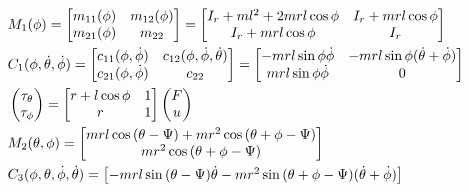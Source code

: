 \begin{align}
&M_1(\phi)
=\begin{bmatrix}
m_{11}(\phi) &m_{12}(\phi)\\
m_{21}(\phi) &m_{22}
\end{bmatrix}
=\begin{bmatrix}
I_r+ml^2+2mrl\cos{\phi}  &I_r+mrl\cos{\phi}\\
I_r+mrl\cos{\phi}       &I_r
\end{bmatrix}\label{eq:M1}\\
&C_1(\phi,\dot{\theta},\dot{\phi})=
\begin{bmatrix}
c_{11}(\phi,\dot{\phi}) &c_{12}(\phi,\dot{\phi},\dot{\theta})\\
c_{21}(\phi,\dot{\phi}) &c_{22}
\end{bmatrix}=
\begin{bmatrix}
-mrl\sin{\phi}\dot{\phi}   &-mrl\sin{\phi}(\dot{\theta}+\dot{\phi})\\
mrl\sin{\phi}\dot{\phi}    &0
\end{bmatrix}\label{eq:C1}\\
&\begin{pmatrix}
\tau_\theta\\
\tau_\phi
\end{pmatrix}
=
\begin{bmatrix}
r+l\cos{\phi}   &1\\
r               &1
\end{bmatrix}
\begin{pmatrix}
F\\
u
\end{pmatrix}\\
&M_2(\theta,\phi)   =
\begin{bmatrix}
mrl\cos{(\theta-\Psi)}+mr^2\cos{(\theta+\phi-\Psi)}\\
mr^2\cos{(\theta+\phi-\Psi)}
\end{bmatrix}\notag\\
&C_3(\phi,\theta,\dot{\phi},\dot{\theta})   =
\begin{bmatrix}
-mrl\sin{(\theta-\Psi)}\dot\theta-mr^2\sin{(\theta+\phi-\Psi)}(\dot\theta+\dot\phi)\\

\end{bmatrix}
\end{align}
